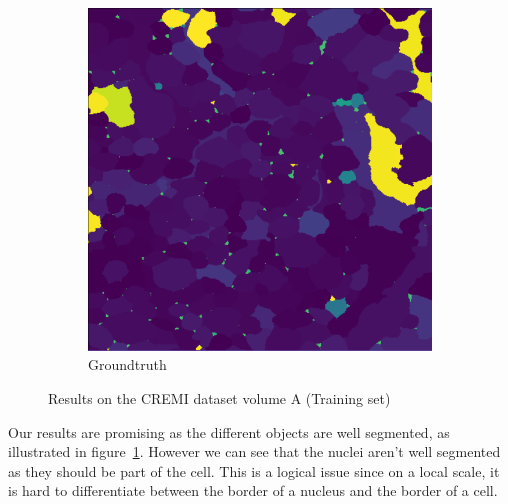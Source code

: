 \begin{figure}[!htbp]
\begin{subfigure}[t]{0.31\textwidth}
        \includegraphics[height=0.7\textwidth]{./images/cremi_gt_1.png}
        \caption{Groundtruth}
    \end{subfigure}
	\caption{Results on the CREMI dataset volume A (Training set)}
	\label{fig:cremi_results_a}
\end{figure}

Our results are promising as the different objects are well segmented, as
illustrated in figure~\ref{fig:cremi_results_a}. 
However we can see that the nuclei aren't well segmented as they should be
part of the cell. This is a logical issue since on a local scale, it is hard to
differentiate between the border of a nucleus and the border of a cell.\\

